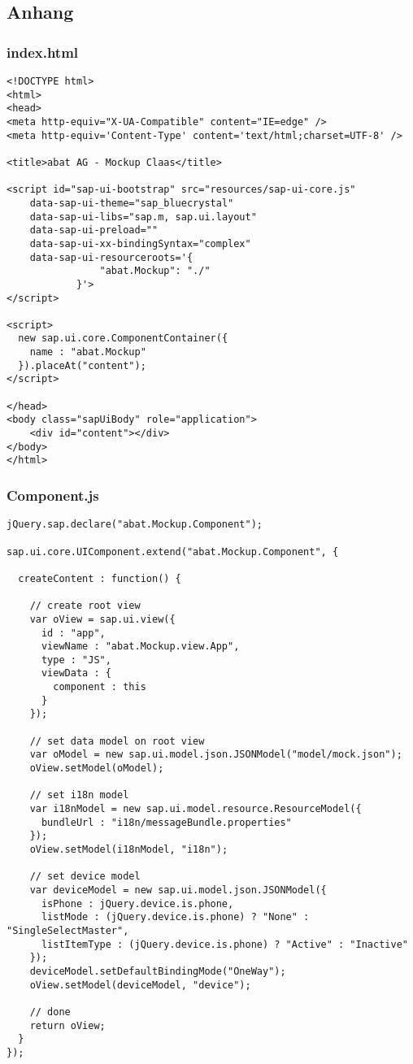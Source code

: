 \subsection*{Anhang}\label{anhang}
\subsubsection*{index.html}
\begin{lstlisting}[frame=htrbl, label=lst:index.html]
<!DOCTYPE html>
<html>
<head>
<meta http-equiv="X-UA-Compatible" content="IE=edge" />
<meta http-equiv='Content-Type' content='text/html;charset=UTF-8' />

<title>abat AG - Mockup Claas</title>

<script id="sap-ui-bootstrap" src="resources/sap-ui-core.js"
	data-sap-ui-theme="sap_bluecrystal"
	data-sap-ui-libs="sap.m, sap.ui.layout"
	data-sap-ui-preload=""
	data-sap-ui-xx-bindingSyntax="complex"
	data-sap-ui-resourceroots='{
				"abat.Mockup": "./"
			}'>
</script>

<script>
  new sap.ui.core.ComponentContainer({
    name : "abat.Mockup"
  }).placeAt("content");
</script>

</head>
<body class="sapUiBody" role="application">
	<div id="content"></div>
</body>
</html>
\end{lstlisting}

\newpage
\subsubsection*{Component.js}
\begin{lstlisting}[frame=htrbl, label=lst:Component.js]
jQuery.sap.declare("abat.Mockup.Component");

sap.ui.core.UIComponent.extend("abat.Mockup.Component", {

  createContent : function() {

    // create root view
    var oView = sap.ui.view({
      id : "app",
      viewName : "abat.Mockup.view.App",
      type : "JS",
      viewData : {
        component : this
      }
    });

    // set data model on root view
    var oModel = new sap.ui.model.json.JSONModel("model/mock.json");
    oView.setModel(oModel);

    // set i18n model
    var i18nModel = new sap.ui.model.resource.ResourceModel({
      bundleUrl : "i18n/messageBundle.properties"
    });
    oView.setModel(i18nModel, "i18n");

    // set device model
    var deviceModel = new sap.ui.model.json.JSONModel({
      isPhone : jQuery.device.is.phone,
      listMode : (jQuery.device.is.phone) ? "None" : "SingleSelectMaster",
      listItemType : (jQuery.device.is.phone) ? "Active" : "Inactive"
    });
    deviceModel.setDefaultBindingMode("OneWay");
    oView.setModel(deviceModel, "device");

    // done
    return oView;
  }
});
\end{lstlisting}

